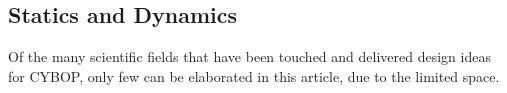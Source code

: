 %
%
%
%
%
%
%

\subsection{Statics and Dynamics}
\label{statics_and_dynamics_heading}

Of the many scientific fields that have been touched and delivered design
ideas for CYBOP, only few can be elaborated in this article, due to the limited
space.






